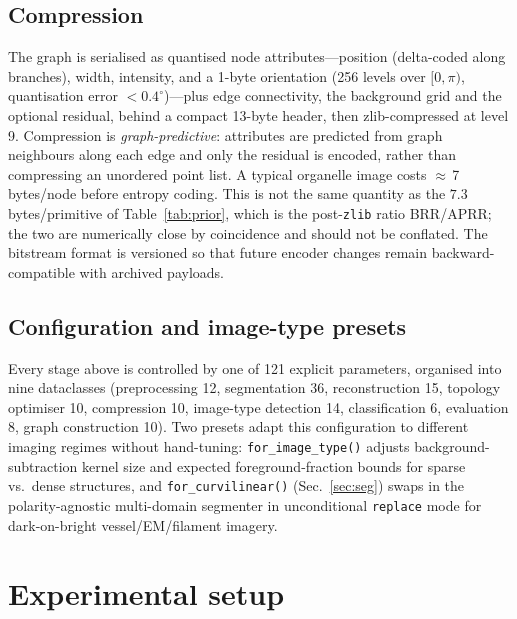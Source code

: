 \documentclass[10pt,a4paper]{article}
\begin{document}
\subsection{Compression}
The graph is serialised as quantised node attributes---position (delta-coded
along branches), width, intensity, and a 1-byte orientation (256 levels over
$[0,\pi)$, quantisation error $<0.4^\circ$)---plus edge connectivity, the
background grid and the optional residual, behind a compact 13-byte header,
then zlib-compressed at level 9. Compression is \emph{graph-predictive}:
attributes are predicted from graph neighbours along each edge and only the
residual is encoded, rather than compressing an unordered point list. A typical organelle image costs
$\approx$\,7\,bytes/node before entropy coding. This is not the same
quantity as the $7.3$ bytes/primitive of Table~\ref{tab:prior}, which is the
post-\texttt{zlib} ratio BRR/APRR; the two are numerically close by
coincidence and should not be conflated.
The bitstream format is versioned so that future encoder changes remain
backward-compatible with archived payloads.

\subsection{Configuration and image-type presets}
\label{sec:config}
Every stage above is controlled by one of 121 explicit parameters, organised
into nine dataclasses (preprocessing 12, segmentation 36, reconstruction 15,
topology optimiser 10, compression 10, image-type detection 14,
classification 6, evaluation 8, graph construction 10). Two presets adapt
this configuration to different imaging regimes without hand-tuning:
\texttt{for\_image\_type()} adjusts background-subtraction kernel size and
expected foreground-fraction bounds for sparse vs.\ dense structures, and
\texttt{for\_curvilinear()} (Sec.~\ref{sec:seg}) swaps in the polarity-agnostic
multi-domain segmenter in unconditional \texttt{replace} mode for dark-on-bright
vessel/EM/filament imagery.

\section{Experimental setup}\label{sec:setup}
\end{document}
